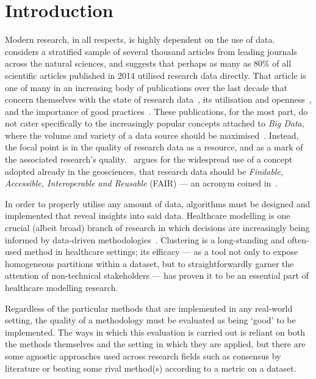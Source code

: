 \section{Introduction}\label{sec:intro}

Modern research, in all respects, is highly dependent on the use of
data.~\cite{Womack2015} considers a stratified sample of several thousand
articles from leading journals across the natural sciences, and suggests that
perhaps as many as 80\% of all scientific articles published in 2014 utilised
research data directly. That article is one of many in an increasing body of
publications over the last decade that concern themselves with the state of
research data~\cite{Higman2019}, its utilisation and
openness~\cite{Aslam2017,Zuiderwijk2020}, and the importance of good
practices~\cite{Colavizza2020,Corti2019}. These publications, for the most part,
do not cater specifically to the increasingly popular concepts attached to
\emph{Big Data}, where the volume and variety of a data source should be
maximised~\cite{Batisti2019}. Instead, the focal point is in the quality of
research data as a resource, and as a mark of the associated research's
quality.~\cite{Stall2019} argues for the widespread use of a concept adopted
already in the geosciences, that research data should be \emph{Findable,
Accessible, Interoperable and Reusable} (FAIR) --- an acronym coined
in~\cite{Wilkinson2016}.

In order to properly utilise any amount of data, algorithms must be designed and
implemented that reveal insights into said data. Healthcare modelling is one
crucial (albeit broad) branch of research in which decisions are increasingly
being informed by data-driven
methodologies~\cite{Alexander2018,Belle2015,RiosZertuche2020}. Clustering is a
long-standing and often-used method in healthcare settings; its efficacy --- as
a tool not only to expose homogeneous partitions within a dataset, but to
straightforwardly garner the attention of non-technical stakeholders --- has
proven it to be an essential part of healthcare modelling research.

Regardless of the particular methods that are implemented in any real-world
setting, the quality of a methodology must be evaluated as being `good' to be
implemented. The ways in which this evaluation is carried out is reliant on both
the methods themselves and the setting in which they are applied, but there are
some agnostic approaches used across research fields such as consensus by
literature or beating some rival method(s) according to a metric on a dataset.

